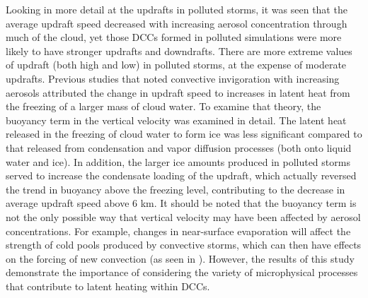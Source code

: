 Looking in more detail at the updrafts in polluted storms, it was seen that the average updraft speed decreased with increasing aerosol concentration through much of the cloud, yet those DCCs formed in polluted simulations were more likely to have stronger updrafts and downdrafts.  There are more extreme values of updraft (both high and low) in polluted storms, at the expense of moderate updrafts.  Previous studies that noted convective invigoration with increasing aerosols attributed the change in updraft speed to increases in latent heat from the freezing of a larger mass of cloud water.  To examine that theory, the buoyancy term in the vertical velocity was examined in detail.  The latent heat released in the freezing of cloud water to form ice was less significant compared to that released from condensation and vapor diffusion processes (both onto liquid water and ice).  In addition, the larger ice amounts produced in polluted storms served to increase the condensate loading of the updraft, which actually reversed the trend in buoyancy above the freezing level, contributing to the decrease in average updraft speed above 6 km.  It should be noted that the buoyancy term is not the only possible way that vertical velocity may have been affected by aerosol concentrations.  For example, changes in near-surface evaporation will affect the strength of cold pools produced by convective storms, which can then have effects on the forcing of new convection (as seen in \cite{vandenHeever:2007p53,Storer:2010p8001}). However, the results of this study demonstrate the importance of considering the variety of microphysical processes that contribute to latent heating within DCCs.

